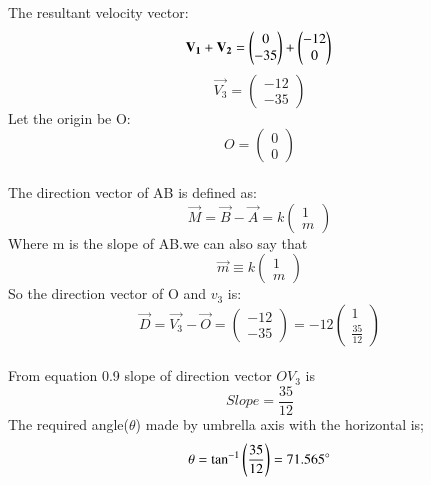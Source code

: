 \documentclass[journal]{IEEEtran}
\begin{document}
The resultant velocity vector:\\
\begin{equation}
\vec{V_{1}}+\vec{V_{2}}=\begin{pmatrix}
    0\\
    -35
\end{pmatrix}
+
\begin{pmatrix}
    -12\\
    0
\end{pmatrix}\\
\end{equation}
\begin{equation}
    \vec{V_{3}}=\begin{pmatrix}
        -12\\
        -35
    \end{pmatrix}
\end{equation}
Let the origin be O:
\begin{equation}
    O=\begin{pmatrix}
        0\\
        0
    \end{pmatrix}
\end{equation}\\


The direction vector of AB is defined as:
\begin{equation}
    \vec{M}=\vec{B}-\vec{A}=k\begin{pmatrix}
        1\\
        m
    \end{pmatrix}
\end{equation}
Where m is the slope of AB.we can also say that\\

\begin{equation}
    \vec{m}\equiv k\begin{pmatrix}
        1\\
        m
    \end{pmatrix}
\end{equation}
So the direction vector of O and $v_{3}$ is:
\begin{equation}
    \vec{D}=\vec{V_{3}}-\vec{O}=\begin{pmatrix}
        -12\\
        -35
    \end{pmatrix}
=-12\begin{pmatrix}
    1\\
    \frac{35}{12}
\end{pmatrix}
\end{equation}\\
From equation 0.9 slope of direction vector $OV_{3}$ is\\
\begin{equation}
    Slope=\frac{35}{12}
\end{equation}
The required angle($\theta$) made by umbrella axis with the horizontal is;\\
\begin{equation}
    \theta=\tan^{-1}\brak{\frac{35}{12}}=71.565^\circ
\end{equation}\\
\end{document}
